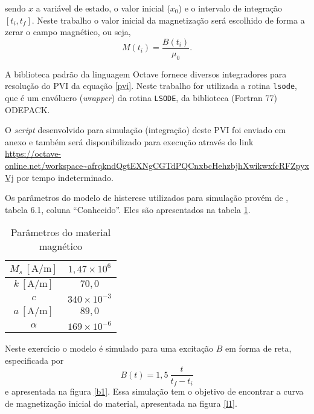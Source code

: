 \documentclass{homeworg}
\begin{document}
sendo $x$ a variável de estado, o valor inicial ($x_0$) e o intervalo de integração $[t_i, t_f]$. Neste trabalho o valor inicial da magnetização será escolhido de forma a zerar o campo magnético, ou seja,
\begin{equation}
  M(t_i) = \frac{B(t_i)}{\mu_0} \text{.}
\end{equation}

\hspace{1cm} A biblioteca padrão da linguagem Octave fornece diversos integradores para resolução do PVI da equação \ref{pvi}. Neste trabalho for utilizada a rotina \texttt{lsode}, que é um envólucro (\textit{wrapper}) da rotina \texttt{LSODE}, da biblioteca (Fortran 77) ODEPACK.

\hspace{1cm} O \textit{script} desenvolvido para simulação (integração) deste PVI foi enviado em anexo e também será disponibilizado para execução através do link \url{https://octave-online.net/workspace~afrqkndQgtEXNgCGTdPQCnxbcHehzbjhXwikwxfcRFZpyxVj} por tempo indeterminado.

\hspace{1cm} Os parâmetros do modelo de histerese utilizados para simulação provém de \cite{joe}, tabela 6.1, coluna ``Conhecido''. Eles são apresentados na tabela \ref{tab}.
\begin{table}[!h]
  \centering
  \begin{tabular}{|c|c|}
    \hline
    $M_s~[\si{\ampere\per\meter}]$ & $1,47\times 10^6$   \\
    \hline
    $k~[\si{\ampere\per\meter}]$   & $70,0$              \\
    \hline
    $c$                            & $340\times 10^{-3}$ \\
    \hline
    $a~[\si{\ampere\per\meter}]$   & $89,0$              \\
    \hline
    $\alpha$                       & $169\times 10^{-6}$ \\
    \hline
  \end{tabular}
  \caption{Parâmetros do material magnético}
  \label{tab}
\end{table}

\exercise

\hspace{1cm} Neste exercício o modelo é simulado para uma excitação $B$ em forma de reta, especificada por
\begin{equation}
  B(t) = 1,5~\frac{t}{t_f-t_i}
\end{equation}
e apresentada na figura \ref{b1}. Essa simulação tem o objetivo de encontrar a curva de magnetização inicial do material, apresentada na figura \ref{l1}.
\end{document}
